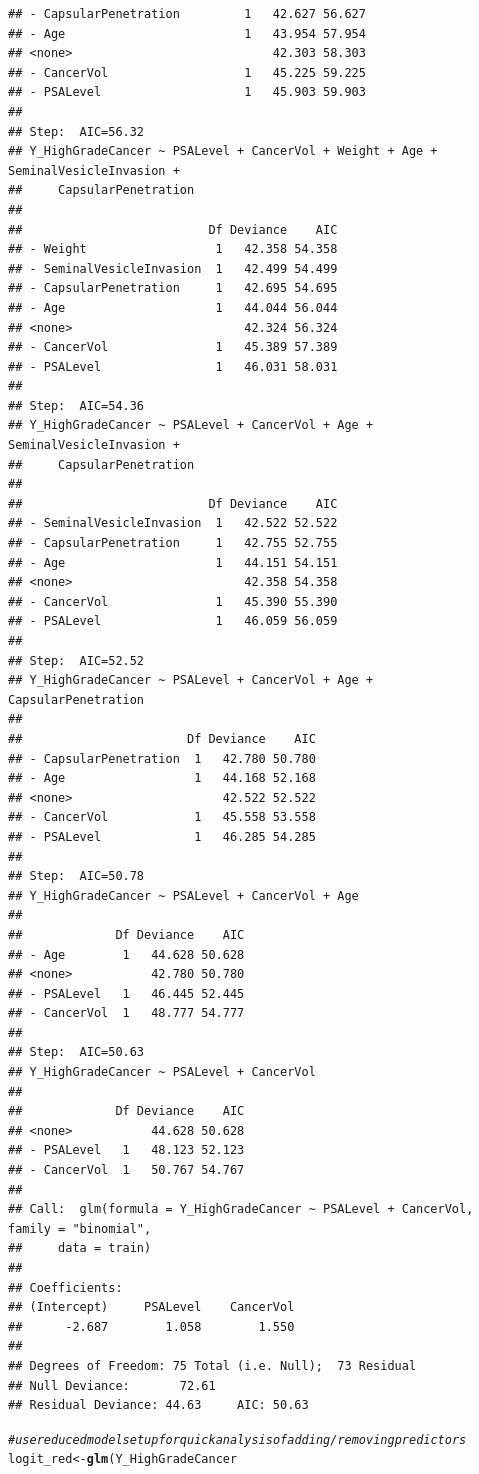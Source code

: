 \documentclass{article}\usepackage[]{graphicx}\usepackage[]{color}
\makeatletter
\newcommand{\hlcom}[1]{\textcolor[rgb]{0.678,0.584,0.686}{\textit{#1}}}%
\newcommand{\hlopt}[1]{\textcolor[rgb]{0,0,0}{#1}}%
\newcommand{\hlstd}[1]{\textcolor[rgb]{0.345,0.345,0.345}{#1}}%
\newcommand{\hlkwb}[1]{\textcolor[rgb]{0.69,0.353,0.396}{#1}}%
\newcommand{\hlkwd}[1]{\textcolor[rgb]{0.737,0.353,0.396}{\textbf{#1}}}%
\newenvironment{kframe}{%
 \def\at@end@of@kframe{}%
 \ifinner\ifhmode%
  \def\at@end@of@kframe{\end{minipage}}%
  \begin{minipage}{\columnwidth}%
 \fi\fi%
 \def\FrameCommand##1{\hskip\@totalleftmargin \hskip-\fboxsep
 \colorbox{shadecolor}{##1}\hskip-\fboxsep
     \hskip-\linewidth \hskip-\@totalleftmargin \hskip\columnwidth}%
 \MakeFramed {\advance\hsize-\width
   \@totalleftmargin\z@ \linewidth\hsize
   \@setminipage}}%
 {\par\unskip\endMakeFramed%
 \at@end@of@kframe}
\newenvironment{knitrout}{}{} %
\makeatother
\begin{document}
\begin{knitrout}
\begin{kframe}
\begin{verbatim}
## - CapsularPenetration         1   42.627 56.627
## - Age                         1   43.954 57.954
## <none>                            42.303 58.303
## - CancerVol                   1   45.225 59.225
## - PSALevel                    1   45.903 59.903
## 
## Step:  AIC=56.32
## Y_HighGradeCancer ~ PSALevel + CancerVol + Weight + Age + SeminalVesicleInvasion + 
##     CapsularPenetration
## 
##                          Df Deviance    AIC
## - Weight                  1   42.358 54.358
## - SeminalVesicleInvasion  1   42.499 54.499
## - CapsularPenetration     1   42.695 54.695
## - Age                     1   44.044 56.044
## <none>                        42.324 56.324
## - CancerVol               1   45.389 57.389
## - PSALevel                1   46.031 58.031
## 
## Step:  AIC=54.36
## Y_HighGradeCancer ~ PSALevel + CancerVol + Age + SeminalVesicleInvasion + 
##     CapsularPenetration
## 
##                          Df Deviance    AIC
## - SeminalVesicleInvasion  1   42.522 52.522
## - CapsularPenetration     1   42.755 52.755
## - Age                     1   44.151 54.151
## <none>                        42.358 54.358
## - CancerVol               1   45.390 55.390
## - PSALevel                1   46.059 56.059
## 
## Step:  AIC=52.52
## Y_HighGradeCancer ~ PSALevel + CancerVol + Age + CapsularPenetration
## 
##                       Df Deviance    AIC
## - CapsularPenetration  1   42.780 50.780
## - Age                  1   44.168 52.168
## <none>                     42.522 52.522
## - CancerVol            1   45.558 53.558
## - PSALevel             1   46.285 54.285
## 
## Step:  AIC=50.78
## Y_HighGradeCancer ~ PSALevel + CancerVol + Age
## 
##             Df Deviance    AIC
## - Age        1   44.628 50.628
## <none>           42.780 50.780
## - PSALevel   1   46.445 52.445
## - CancerVol  1   48.777 54.777
## 
## Step:  AIC=50.63
## Y_HighGradeCancer ~ PSALevel + CancerVol
## 
##             Df Deviance    AIC
## <none>           44.628 50.628
## - PSALevel   1   48.123 52.123
## - CancerVol  1   50.767 54.767
## 
## Call:  glm(formula = Y_HighGradeCancer ~ PSALevel + CancerVol, family = "binomial", 
##     data = train)
## 
## Coefficients:
## (Intercept)     PSALevel    CancerVol  
##      -2.687        1.058        1.550  
## 
## Degrees of Freedom: 75 Total (i.e. Null);  73 Residual
## Null Deviance:	    72.61 
## Residual Deviance: 44.63 	AIC: 50.63
\end{verbatim}
\begin{alltt}
\hlcom{# use reduced model setup for quick analysis of adding/removing predictors}
\hlstd{logit_red} \hlkwb{<-} \hlkwd{glm}\hlstd{(Y_HighGradeCancer} \hlopt{~}

\end{alltt}
\end{kframe}
\end{knitrout}
\end{document}

